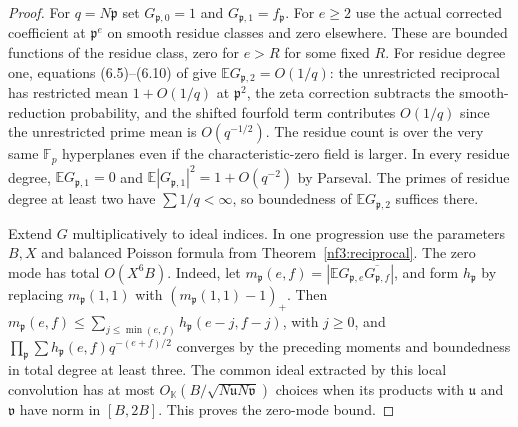 \documentclass[11pt,letterpaper]{article}
\theoremstyle{definition}
\numberwithin{equation}{section}
\begin{document}
\begin{proof}
For $q=N\mathfrak p$ set $G_{\mathfrak p,0}=1$ and
$G_{\mathfrak p,1}=f_{\mathfrak p}$. For $e\ge2$ use the actual
corrected coefficient at $\mathfrak p^e$ on smooth residue
classes and zero elsewhere. These are bounded functions of the
residue class, zero for $e>R$ for some fixed $R$. For residue
degree one, equations (6.5)--(6.10) of \cite{c3:wang} give
$\mathbb E G_{\mathfrak p,2}=O(1/q)$: the unrestricted
reciprocal has restricted mean $1+O(1/q)$ at $\mathfrak p^2$,
the zeta correction subtracts the smooth-reduction probability,
and the shifted fourfold term contributes $O(1/q)$ since the
unrestricted prime mean is $O(q^{-1/2})$. The residue count is
over the very same $\mathbb F_p$ hyperplanes even if the
characteristic-zero field is larger. In every residue degree,
$\mathbb E G_{\mathfrak p,1}=0$ and
$\mathbb E|G_{\mathfrak p,1}|^2=1+O(q^{-2})$ by Parseval.
The primes of residue degree at least two have
$\sum 1/q<\infty$, so boundedness of $\mathbb E G_{\mathfrak p,2}$
suffices there.

Extend $G$ multiplicatively to ideal indices. In one progression
use the parameters $B,X$ and balanced Poisson formula from
Theorem~\ref{nf3:reciprocal}. The zero mode has total $O(X^6B)$.
Indeed, let $m_{\mathfrak p}(e,f)=
|\mathbb E G_{\mathfrak p,e}\overline{G_{\mathfrak p,f}}|$,
and form $h_{\mathfrak p}$ by replacing $m_{\mathfrak p}(1,1)$
with $(m_{\mathfrak p}(1,1)-1)_+$. Then
$m_{\mathfrak p}(e,f)\le\sum_{j\le\min(e,f)}
h_{\mathfrak p}(e-j,f-j)$, with $j\ge0$, and
$\prod_{\mathfrak p}\sum h_{\mathfrak p}(e,f)q^{-(e+f)/2}$
converges by the preceding moments and boundedness in total
degree at least three. The common ideal extracted by this local
convolution has at most $O_{\mathbb K}(B/\sqrt{N\mathfrak u
N\mathfrak v})$ choices when its products with $\mathfrak u$ and
$\mathfrak v$ have norm in $[B,2B]$. This proves the zero-mode bound.


\end{proof}
\end{document}
